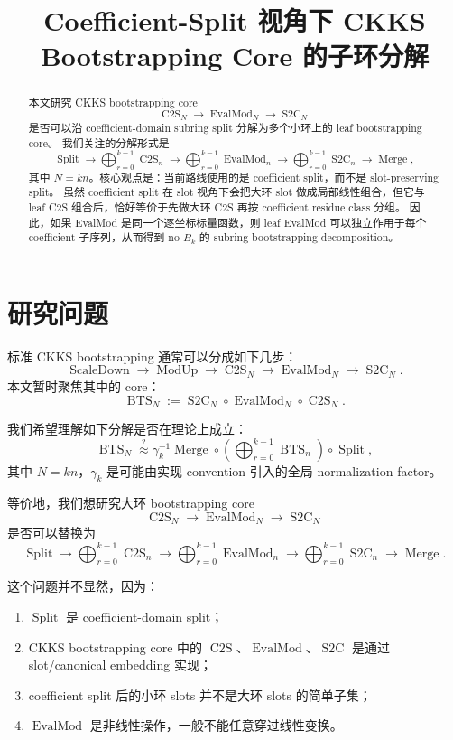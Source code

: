 \documentclass[UTF8,11pt]{ctexart}
\title{Coefficient-Split 视角下 CKKS Bootstrapping Core 的子环分解}
\author{}
\date{}
\theoremstyle{definition}
\newcommand{\CtwoS}{\operatorname{C2S}}
\newcommand{\StwoC}{\operatorname{S2C}}
\newcommand{\BTS}{\operatorname{BTS}}
\newcommand{\Split}{\operatorname{Split}}
\newcommand{\Merge}{\operatorname{Merge}}
\newcommand{\EvalMod}{\operatorname{EvalMod}}
\begin{document}
\maketitle

\begin{abstract}
本文研究 CKKS bootstrapping core
\[
\CtwoS_N \longrightarrow \EvalMod_N \longrightarrow \StwoC_N
\]
是否可以沿 coefficient-domain subring split 分解为多个小环上的 leaf bootstrapping core。
我们关注的分解形式是
\[
\Split
\longrightarrow
\bigoplus_{r=0}^{k-1}\CtwoS_n
\longrightarrow
\bigoplus_{r=0}^{k-1}\EvalMod_n
\longrightarrow
\bigoplus_{r=0}^{k-1}\StwoC_n
\longrightarrow
\Merge,
\]
其中 \(N=kn\)。核心观点是：当前路线使用的是 coefficient split，而不是 slot-preserving split。
虽然 coefficient split 在 slot 视角下会把大环 slot 做成局部线性组合，但它与 leaf C2S 组合后，恰好等价于先做大环 C2S 再按 coefficient residue class 分组。
因此，如果 EvalMod 是同一个逐坐标标量函数，则 leaf EvalMod 可以独立作用于每个 coefficient 子序列，从而得到 no-\(B_k\) 的 subring bootstrapping decomposition。
\end{abstract}

\tableofcontents

\section{研究问题}

标准 CKKS bootstrapping 通常可以分成如下几步：
\[
\operatorname{ScaleDown}
\longrightarrow
\operatorname{ModUp}
\longrightarrow
\CtwoS_N
\longrightarrow
\EvalMod_N
\longrightarrow
\StwoC_N.
\]
本文暂时聚焦其中的 core：
\[
\BTS_N
:=
\StwoC_N\circ \EvalMod_N\circ \CtwoS_N.
\]

我们希望理解如下分解是否在理论上成立：
\[
\BTS_N
\stackrel{?}{\approx}
\gamma_k^{-1}
\Merge
\circ
\left(
\bigoplus_{r=0}^{k-1}\BTS_n
\right)
\circ
\Split,
\]
其中 \(N=kn\)，\(\gamma_k\) 是可能由实现 convention 引入的全局 normalization factor。

等价地，我们想研究大环 bootstrapping core
\[
\CtwoS_N
\longrightarrow
\EvalMod_N
\longrightarrow
\StwoC_N
\]
是否可以替换为
\[
\Split
\longrightarrow
\bigoplus_{r=0}^{k-1}\CtwoS_n
\longrightarrow
\bigoplus_{r=0}^{k-1}\EvalMod_n
\longrightarrow
\bigoplus_{r=0}^{k-1}\StwoC_n
\longrightarrow
\Merge.
\]

这个问题并不显然，因为：
\begin{enumerate}[label=(\arabic*)]
    \item \(\Split\) 是 coefficient-domain split；
    \item CKKS bootstrapping core 中的 \(\CtwoS\)、\(\EvalMod\)、\(\StwoC\) 是通过 slot/canonical embedding 实现；
    \item coefficient split 后的小环 slots 并不是大环 slots 的简单子集；
    \item \(\EvalMod\) 是非线性操作，一般不能任意穿过线性变换。
\end{enumerate}
\end{document}
